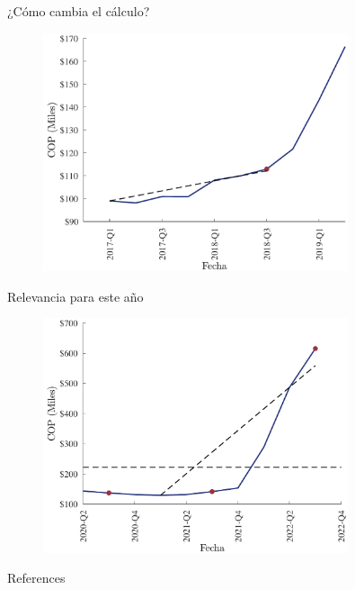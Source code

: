\documentclass[usenames,dvipsnames]{beamer}
\begin{document}
\begin{frame}{¿Cómo cambia el cálculo?}
    \begin{figure}
        \centering
        \includegraphics[width=0.8\textwidth]{Figures/newCalc.pdf}
    \end{figure}
\end{frame}

\begin{frame}{Relevancia para este año}
    \begin{figure}
        \centering
        \includegraphics[width=0.8\textwidth]{Figures/newCalc2.pdf}
    \end{figure}
\end{frame}


\begin{frame}[allowframebreaks]{References}
    
    
\end{frame}
\end{document}
